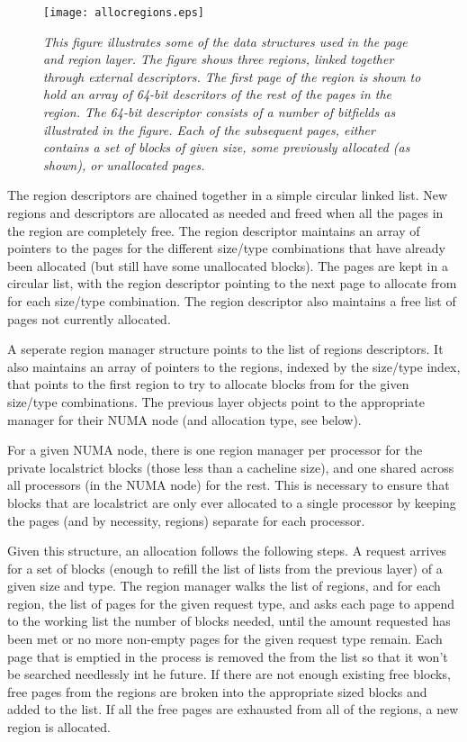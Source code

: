 \documentclass[dvips,11pt]{article}
\begin{document}
\begin{figure}[t]
  \centerline{
    \texttt{[image: allocregions.eps]}
    }
  \caption{\small\emph{This figure illustrates some of the data structures
      used in the page and region layer.  The figure shows three regions,
      linked together through external descriptors.  The first page of the
      region is shown to hold an array of 64-bit descritors of the rest of the
      pages in the region.  The 64-bit descriptor consists of a number of
      bitfields as illustrated in the figure.  Each of the subsequent
      pages, either contains a set of blocks of given size, some previously 
      allocated (as shown), or unallocated pages.}}
  \label{allocregions:fig}
\end{figure}

The region descriptors are chained together in a simple circular linked
list.  New regions and descriptors are allocated as needed and freed when
all the pages in the region are completely free.  The region descriptor
maintains an array of pointers to the pages for the different size/type
combinations that have already been allocated (but still have some
unallocated blocks).  The pages are kept in a circular list, with the
region descriptor pointing to the next page to allocate from for each
size/type combination.  The region descriptor also maintains a free list of 
pages not currently allocated.

A seperate region manager structure points to the list of regions
descriptors.  It also maintains an array of pointers to the regions,
indexed by the size/type index, that points to the first region to try to
allocate blocks from for the given size/type combinations.  The previous
layer objects point to the appropriate manager for their NUMA node (and
allocation type, see below).

For a given NUMA node, there is one region manager per processor for the
private localstrict blocks (those less than a cacheline size), and one
shared across all processors (in the NUMA node) for the rest.  This is
necessary to ensure that blocks that are localstrict are only ever
allocated to a single processor by keeping the pages (and by necessity,
regions) separate for each processor.

Given this structure, an allocation follows the following steps.  A request
arrives for a set of blocks (enough to refill the list of lists from the
previous layer) of a given size and type.  The region manager walks the
list of regions, and for each region, the list of pages for the given
request type, and asks each page to append to the working list the number
of blocks needed, until the amount requested has been met or no more
non-empty pages for the given request type remain.  Each page that is
emptied in the process is removed the from the list so that it won't be
searched needlessly int he future.  If there are not enough existing free
blocks, free pages from the regions are broken into the appropriate sized
blocks and added to the list.  If all the free pages are exhausted from all
of the regions, a new region is allocated.
\end{document}
